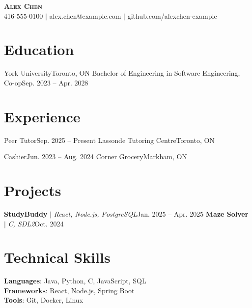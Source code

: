 \documentclass[letterpaper,11pt]{article}
\begin{document}
\begin{center}
    \textbf{\Huge \scshape Alex Chen} \\ \vspace{1pt}
    \small 416-555-0100 $|$ alex.chen@example.com $|$ github.com/alexchen-example
\end{center}

\section{Education}
  \resumeSubHeadingListStart
    \resumeSubheading
      {York University}{Toronto, ON}
      {Bachelor of Engineering in Software Engineering, Co-op}{Sep. 2023 -- Apr. 2028}
  \resumeSubHeadingListEnd

\section{Experience}
  \resumeSubHeadingListStart
    \resumeSubheading
      {Peer Tutor}{Sep. 2025 -- Present}
      {Lassonde Tutoring Centre}{Toronto, ON}
      \resumeItemListStart
      \resumeItemListEnd

    \resumeSubheading
      {Cashier}{Jun. 2023 -- Aug. 2024}
      {Corner Grocery}{Markham, ON}
      \resumeItemListStart
      \resumeItemListEnd
  \resumeSubHeadingListEnd

\section{Projects}
    \resumeSubHeadingListStart
      \resumeProjectHeading
          {\textbf{StudyBuddy} $|$ \emph{React, Node.js, PostgreSQL}}{Jan. 2025 -- Apr. 2025}
          \resumeItemListStart
          \resumeItemListEnd
      \resumeProjectHeading
          {\textbf{Maze Solver} $|$ \emph{C, SDL2}}{Oct. 2024}
          \resumeItemListStart
          \resumeItemListEnd
    \resumeSubHeadingListEnd

\section{Technical Skills}
 \begin{itemize}[leftmargin=0.15in, label={}]
    \small{\item{
     \textbf{Languages}{: Java, Python, C, JavaScript, SQL} \\
     \textbf{Frameworks}{: React, Node.js, Spring Boot} \\
     \textbf{Tools}{: Git, Docker, Linux}
    }}
 \end{itemize}
\end{document}
